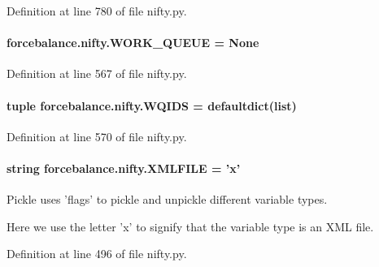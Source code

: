Definition at line 780 of file nifty.\-py.

\hypertarget{namespaceforcebalance_1_1nifty_ac743196ed04a3315e95bbaaaf60856b8}{
\paragraph[{W\-O\-R\-K\-\_\-\-Q\-U\-E\-U\-E}]{\setlength{\rightskip}{0pt plus 5cm}forcebalance.\-nifty.\-W\-O\-R\-K\-\_\-\-Q\-U\-E\-U\-E = None}}\label{namespaceforcebalance_1_1nifty_ac743196ed04a3315e95bbaaaf60856b8}


Definition at line 567 of file nifty.\-py.

\hypertarget{namespaceforcebalance_1_1nifty_a58baa87808815c9c227721b594804def}{
\paragraph[{W\-Q\-I\-D\-S}]{\setlength{\rightskip}{0pt plus 5cm}tuple forcebalance.\-nifty.\-W\-Q\-I\-D\-S = defaultdict(list)}}\label{namespaceforcebalance_1_1nifty_a58baa87808815c9c227721b594804def}


Definition at line 570 of file nifty.\-py.

\hypertarget{namespaceforcebalance_1_1nifty_a338d5080f95188c37271c306f64093d8}{
\paragraph[{X\-M\-L\-F\-I\-L\-E}]{\setlength{\rightskip}{0pt plus 5cm}string forcebalance.\-nifty.\-X\-M\-L\-F\-I\-L\-E = 'x'}}\label{namespaceforcebalance_1_1nifty_a338d5080f95188c37271c306f64093d8}


Pickle uses 'flags' to pickle and unpickle different variable types. 

Here we use the letter 'x' to signify that the variable type is an X\-M\-L file. 

Definition at line 496 of file nifty.\-py.

